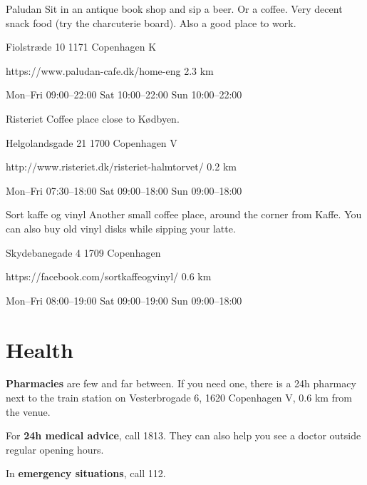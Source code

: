 \begin{fooditem}
{Paludan}
{Sit in an antique book shop and sip a beer. Or a coffee. Very decent snack food (try the charcuterie board). Also a good place to work.}
{\begin{addr}
{Fiolstræde 10}
{1171 Copenhagen K}
\end{addr}}
{https://www.paludan-cafe.dk/home-eng}
{2.3 km}
{}
{\begin{ohours}
{Mon–Fri}
{09:00–22:00}
{​​Sat}
{10:00–22:00}
{​Sun}
{10:00–22:00}
{}
{}
\end{ohours}}
\end{fooditem}
\begin{fooditem}
{Risteriet}
{Coffee place close to Kødbyen.}
{\begin{addr}
{Helgolandsgade 21}
{1700 Copenhagen V}
\end{addr}}
{http://www.risteriet.dk/risteriet-halmtorvet/}
{0.2 km}
{}
{\begin{ohours}
{Mon–Fri}
{07:30–18:00}
{Sat}
{ 09:00–18:00}
{Sun}
{09:00–18:00}
{}
{}
\end{ohours}}
\end{fooditem}
\begin{fooditem}
{Sort kaffe og vinyl}
{Another small coffee place, around the corner from Kaffe. You can also buy old vinyl disks while sipping your latte.}
{\begin{addr}
{Skydebanegade 4}
{1709 Copenhagen}
\end{addr}}
{https://facebook.com/sortkaffeogvinyl/}
{0.6 km}
{}
{\begin{ohours}
{Mon–Fri}
{08:00–19:00}
{Sat}
{09:00–19:00}
{Sun}
{09:00–18:00}
{}
{}
\end{ohours}}
\end{fooditem}





\section{Health}
\textbf{Pharmacies} are few and far between. If you need one, there is a 24h pharmacy next to the train station on Vesterbrogade 6, 1620 Copenhagen V, 0.6 km from the venue.
\par
For \textbf{24h medical advice}, call 1813. They can also help you see a doctor outside regular opening hours. 
\par
In \textbf{emergency situations}, call 112.









